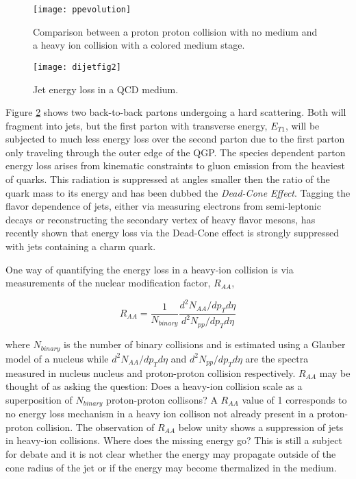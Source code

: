 \begin{figure}[h]
\texttt{[image: ppevolution]}
\centering
\caption{Comparison between a proton proton collision with no medium and a heavy ion collision with a colored medium stage\cite{PhysRevD.27.140}.}
\label{fig:HeavyIonCollisionvPP}
\end{figure}

\begin{figure}[h]
\texttt{[image: dijetfig2]}
\centering
\caption{Jet energy loss in a QCD medium\cite{Mohanty:2013yca}.}
\label{fig:JetEloss}
\end{figure}

\noindent
Figure \ref{fig:JetEloss} shows two back-to-back partons undergoing a hard scattering.  Both will fragment into jets, but the first parton with transverse energy, $E_{T1}$, will be subjected to much less energy loss over the second parton due to the first parton only traveling through the outer edge of the QGP.  The species dependent parton energy loss arises from kinematic constraints to gluon emission from the heaviest of quarks.  This radiation is suppressed at angles smaller then the ratio of the quark mass to its energy and has been dubbed the \textit{Dead-Cone Effect}\cite{Thomas:2004ie}.  Tagging the flavor dependence of jets, either via measuring electrons from semi-leptonic decays or reconstructing the secondary vertex of heavy flavor mesons, has recently shown that energy loss via the Dead-Cone effect is strongly suppressed with jets containing a charm quark\cite{CAO2018255}.

One way of quantifying the energy loss in a heavy-ion collision is via measurements of the nuclear modification factor, $R_{AA}$,


\begin{equation}
R_{AA} = \frac{1}{N_{binary}} \frac{d^{2}N_{AA}/dp_{T}d\eta}{d^{2}N_{pp}/dp_{T}d\eta}
\label{eq:RAA}
\end{equation}

\noindent
where $N_{binary}$ is the number of binary collisions and is estimated using a Glauber model\cite{Miller:2007ri} of a nucleus while $d^{2}N_{AA}/dp_{T}d\eta$ and $d^{2}N_{pp}/dp_{T}d\eta$ are the spectra measured in nucleus nucleus and proton-proton collision respectively.  $R_{AA}$ may be thought of as asking the question: Does a heavy-ion collision scale as a superposition of $N_{binary}$ proton-proton collisons?  A $R_{AA}$ value of 1 corresponds to no energy loss mechanism in a heavy ion collison not already present in a proton-proton collision.  The observation of $R_{AA}$ below unity shows a suppression of jets in heavy-ion collisions.  Where does the missing energy go?  This is still a subject for debate and it is not clear whether the energy may propagate outside of the cone radius of the jet or if the energy may become thermalized in the medium.


